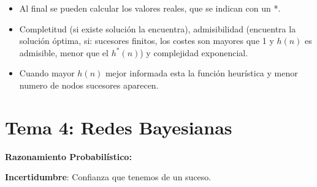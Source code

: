 \documentclass[12pt, twoside, openright]{report} %
\begin{document}
\begin{itemize}
    \begin{itemize}
    \item Al final se pueden calcular los valores reales, que se indican con
      un *.
      
    \item Completitud (si existe solución la encuentra), admisibilidad
      (encuentra la solución óptima, si: sucesores finitos, los costes
      son mayores que 1 y $h(n)$ es admisible, menor que el $h^*(n)$) y
      complejidad exponencial.
      
    \item Cuando mayor $h(n)$ mejor informada esta la función heurística y
      menor numero de nodos sucesores aparecen.
      
    \end{itemize}
  \end{itemize}


\chapter{Tema 4: Redes Bayesianas}


  \textbf{Razonamiento Probabilístico:}

  \textbf{Incertidumbre}: Confianza que tenemos de un suceso.
\end{document}
